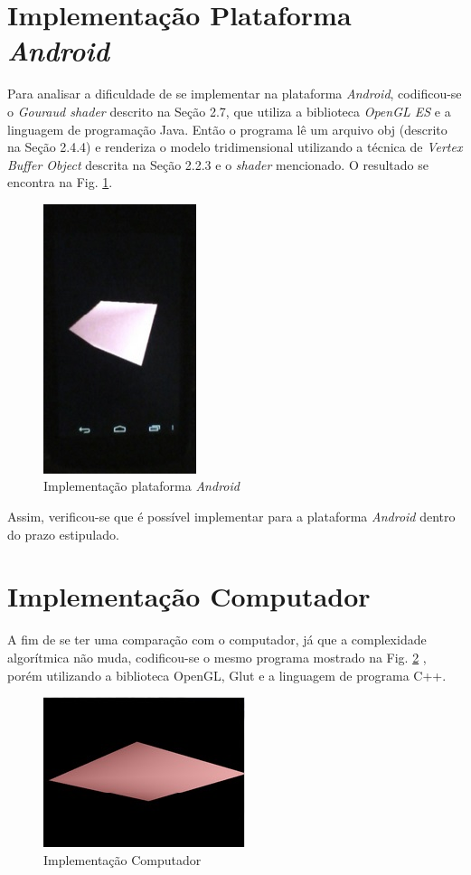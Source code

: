 \section{Implementação Plataforma \textit{Android}} 

	Para analisar a dificuldade de se implementar na plataforma \textit{Android}, codificou-se o \textit{Gouraud shader} descrito na Seção 2.7, que utiliza a biblioteca \textit{OpenGL ES} e a linguagem de programação Java. Então o programa lê um arquivo obj (descrito na Seção 2.4.4) e renderiza o modelo tridimensional utilizando a técnica de \textit{Vertex Buffer Object} descrita na Seção 2.2.3 e o \textit{shader} mencionado. O resultado se encontra na  Fig. \ref{android}.

	\begin{figure}[h]
	\centering
		\includegraphics[keepaspectratio=true,scale=1.0]{figuras/android.jpg}
	\caption{Implementação plataforma \textit{Android}}
	\label{android}
	\end{figure}

	Assim, verificou-se que é possível implementar para a plataforma \textit{Android} dentro do prazo estipulado.  

\section{Implementação Computador}

	A fim de se ter uma comparação com o computador, já que a complexidade algorítmica não muda, codificou-se o mesmo programa mostrado na Fig. \ref{computador} , porém utilizando a biblioteca OpenGL, Glut e a linguagem de programa C++.

	\begin{figure}[h]
	\centering
		\includegraphics[keepaspectratio=true,scale=1.0]{figuras/computador.jpg}
	\caption{Implementação Computador}
	\label{computador}
	\end{figure}

